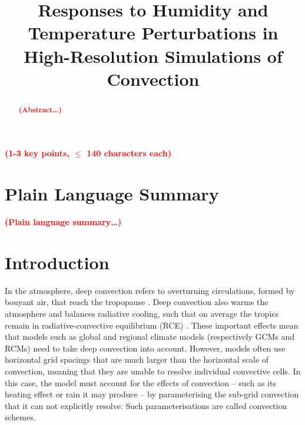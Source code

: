 \documentclass[draft]{agujournal2019}
\newcommand{\todo}[1]{\textcolor{red}{\textbf{(#1)}}}
\begin{document}
\title{Responses to Humidity and Temperature Perturbations in High-Resolution Simulations of Convection}




\begin{keypoints}
\item \todo{1-3 key points, $\leq$ 140 characters each}
\end{keypoints}

\justifying
\begin{abstract}
\todo{Abstract\ldots}
\end{abstract}

\section*{Plain Language Summary}
\todo{Plain language summary\ldots}

\section{Introduction}

In the atmosphere, deep convection refers to overturning circulations, formed by
bouyant air, that reach the tropopause \cite{Wallace_2006}. Deep convection 
also warms the atmosphere and balances
radiative cooling, such that on average the tropics remain in
radiative-convective equilibrium (RCE) \cite{Manabe_JAS_1964}. These important
effects mean that models such as global and regional climate models
(respectively GCMs and RCMs) need to take deep convection into account. However,
models often use horizontal grid spacings that are much larger than the
horizontal scale of convection, meaning that they are unable to resolve
individual convective cells. In this case, the model must account for the
effects of convection -- such as its heating effect or rain it may produce -- by
parameterising the sub-grid convection that it can not explicitly resolve. Such
parameterisations are called convection schemes. 
\end{document}
